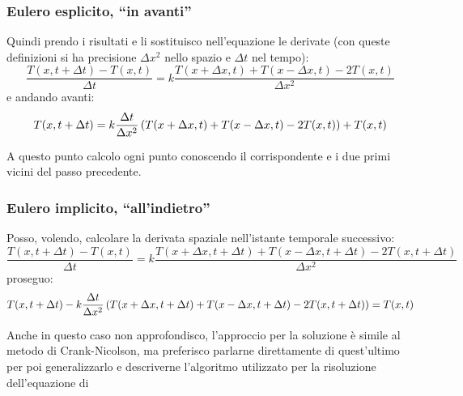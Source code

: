 \subsubsection{Eulero esplicito, ``in avanti''}
Quindi prendo i risultati e li sostituisco nell'equazione le derivate (con queste definizioni si ha precisione $\Delta x^2$ nello spazio e $\Delta t$ nel tempo):
\begin{equation}
  \frac{T(x,t+\Delta t)-T(x,t)}{\Delta t} = k \frac{T(x+\Delta x,t)+T(x-\Delta x,t)-2T(x,t)}{\Delta x^2}
\end{equation}
e andando avanti:
\begin{equation}
  T(x,t+\Delta t) = k\frac{\Delta t}{\Delta x^2} \left( T(x+\Delta x,t)+T(x-\Delta x,t)-2T(x,t) \right) + T(x,t)
\end{equation}

A questo punto calcolo ogni punto conoscendo il corrispondente e i due primi vicini del passo precedente.
\subsubsection{Eulero implicito, ``all'indietro''}
Posso, volendo, calcolare la derivata spaziale nell'istante temporale successivo:
\begin{equation}
  \frac{T(x,t+\Delta t)-T(x,t)}{\Delta t} = k \frac{T(x+\Delta x,t+\Delta t)+T(x-\Delta x,t+\Delta t)-2T(x,t+\Delta t)}{\Delta x^2}
\end{equation}
proseguo:
\begin{equation}
  T(x,t+\Delta t)- k \frac{\Delta t}{\Delta x^2}\left( T(x+\Delta x,t+\Delta t)+T(x-\Delta x,t+\Delta t)-2T(x,t+\Delta t) \right) = T(x,t)
\end{equation}

Anche in questo caso non approfondisco, l'approccio per la soluzione \`e simile al metodo di Crank-Nicolson, ma preferisco parlarne direttamente di quest'ultimo per poi generalizzarlo e descriverne l'algoritmo utilizzato per la risoluzione dell'equazione di \Schrodinger

